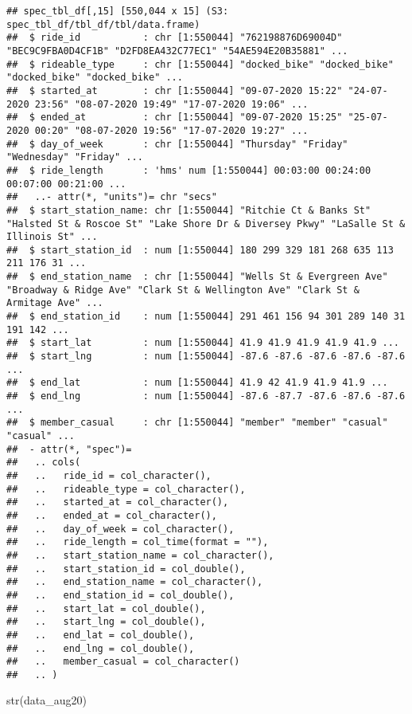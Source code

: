 \documentclass[
]{article}
\newenvironment{Shaded}{\begin{snugshade}}{\end{snugshade}}
\newcommand{\FunctionTok}[1]{\textcolor[rgb]{0.00,0.00,0.00}{#1}}
\newcommand{\NormalTok}[1]{#1}
\begin{document}
\begin{verbatim}
## spec_tbl_df[,15] [550,044 x 15] (S3: spec_tbl_df/tbl_df/tbl/data.frame)
##  $ ride_id           : chr [1:550044] "762198876D69004D" "BEC9C9FBA0D4CF1B" "D2FD8EA432C77EC1" "54AE594E20B35881" ...
##  $ rideable_type     : chr [1:550044] "docked_bike" "docked_bike" "docked_bike" "docked_bike" ...
##  $ started_at        : chr [1:550044] "09-07-2020 15:22" "24-07-2020 23:56" "08-07-2020 19:49" "17-07-2020 19:06" ...
##  $ ended_at          : chr [1:550044] "09-07-2020 15:25" "25-07-2020 00:20" "08-07-2020 19:56" "17-07-2020 19:27" ...
##  $ day_of_week       : chr [1:550044] "Thursday" "Friday" "Wednesday" "Friday" ...
##  $ ride_length       : 'hms' num [1:550044] 00:03:00 00:24:00 00:07:00 00:21:00 ...
##   ..- attr(*, "units")= chr "secs"
##  $ start_station_name: chr [1:550044] "Ritchie Ct & Banks St" "Halsted St & Roscoe St" "Lake Shore Dr & Diversey Pkwy" "LaSalle St & Illinois St" ...
##  $ start_station_id  : num [1:550044] 180 299 329 181 268 635 113 211 176 31 ...
##  $ end_station_name  : chr [1:550044] "Wells St & Evergreen Ave" "Broadway & Ridge Ave" "Clark St & Wellington Ave" "Clark St & Armitage Ave" ...
##  $ end_station_id    : num [1:550044] 291 461 156 94 301 289 140 31 191 142 ...
##  $ start_lat         : num [1:550044] 41.9 41.9 41.9 41.9 41.9 ...
##  $ start_lng         : num [1:550044] -87.6 -87.6 -87.6 -87.6 -87.6 ...
##  $ end_lat           : num [1:550044] 41.9 42 41.9 41.9 41.9 ...
##  $ end_lng           : num [1:550044] -87.6 -87.7 -87.6 -87.6 -87.6 ...
##  $ member_casual     : chr [1:550044] "member" "member" "casual" "casual" ...
##  - attr(*, "spec")=
##   .. cols(
##   ..   ride_id = col_character(),
##   ..   rideable_type = col_character(),
##   ..   started_at = col_character(),
##   ..   ended_at = col_character(),
##   ..   day_of_week = col_character(),
##   ..   ride_length = col_time(format = ""),
##   ..   start_station_name = col_character(),
##   ..   start_station_id = col_double(),
##   ..   end_station_name = col_character(),
##   ..   end_station_id = col_double(),
##   ..   start_lat = col_double(),
##   ..   start_lng = col_double(),
##   ..   end_lat = col_double(),
##   ..   end_lng = col_double(),
##   ..   member_casual = col_character()
##   .. )
\end{verbatim}

\begin{Shaded}
\begin{Highlighting}[]
\FunctionTok{str}\NormalTok{(data\_aug20)}
\end{Highlighting}
\end{Shaded}
\end{document}
